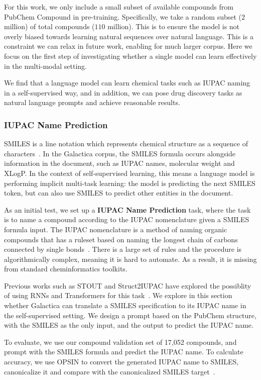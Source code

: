 {For this work, we only include a small subset of available compounds from PubChem Compound in pre-training. Specifically, we take a random subset ($2$ million) of total compounds ($110$ million). This is to ensure the model is not overly biased towards learning natural sequences over natural language. This is a constraint we can relax in future work, enabling for much larger corpus. Here we focus on the first step of investigating whether a single model can learn effectively in the multi-modal setting.

We find that a language model can learn chemical tasks such as IUPAC naming in a self-supervised way, and in addition, we can pose drug discovery tasks as natural language prompts and achieve reasonable results.

\subsubsection{IUPAC Name Prediction}

SMILES is a line notation which represents chemical structure as a sequence of characters~\citep{SMILES}. In the Galactica corpus, the SMILES formula occurs alongside information in the document, such as IUPAC names, molecular weight and XLogP. In the context of self-supervised learning, this means a language model is performing implicit multi-task learning: the model is predicting the next SMILES token, but can also use SMILES to predict other entities in the document. 

As an initial test, we set up a \textbf{IUPAC Name Prediction} task, where the task is to name a compound according to the IUPAC nomenclature given a SMILES formula input. The IUPAC nomenclature is a method of naming organic compounds that has a ruleset based on naming the longest chain of carbons connected by single bonds~\citep{IUPACNaming}. There is a large set of rules and the procedure is algorithmically complex, meaning it is hard to automate. As a result, it is missing from standard cheminformatics toolkits.

Previous works such as STOUT and Struct2IUPAC have explored the possiblity of using RNNs and Transformers for this task~\citep{STOUT,Struct2IUPAC}. We explore in this section whether Galactica can translate a SMILES specification to its IUPAC name in the self-supervised setting. We design a prompt based on the PubChem  structure, with the SMILES as the only input, and the output to predict the IUPAC name.

To evaluate, we use our compound validation set of 17,052 compounds, and prompt with the SMILES formula and predict the IUPAC name. To calculate accuracy, we use OPSIN to convert the generated IUPAC name to SMILES, canonicalize it and compare with the canonicalized SMILES target~\citep{OPSIN}. 

}
